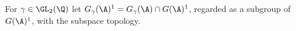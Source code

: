 For $\gamma\in\GL_2(\Q)$ let $G_\gamma(\A)^1=G_\gamma(\A)\cap G(\A)^1$, regarded as a subgroup of $G(\A)^1$, with the subspace
topology.
